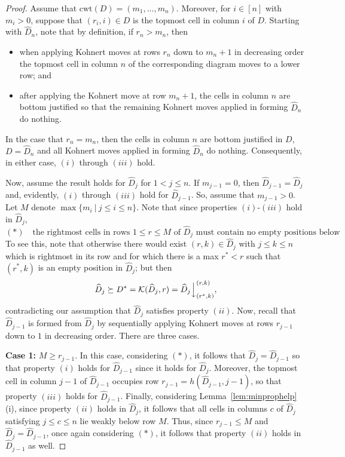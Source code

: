 \documentclass[letterpaper,10pt]{article}
\newcommand{\ldownarrow}{\Big\downarrow}
\begin{document}
\begin{proof}
    Assume that $\mathrm{cwt}(D)=(m_1,\hdots,m_n)$. Moreover, for $i\in [n]$ with $m_i>0$, suppose that $(r_i,i)\in D$ is the topmost cell in column $i$ of $D$. Starting with $\widehat{D}_{n}$, note that by definition, if $r_n>m_n$, then 
    \begin{itemize}
        \item when applying Kohnert moves at rows $r_n$ down to $m_n+1$ in decreasing order the topmost cell in column $n$ of the corresponding diagram moves to a lower row; and
        \item after applying the Kohnert move at row $m_n+1$, the cells in column $n$ are bottom justified so that the remaining Kohnert moves applied in forming $\widehat{D}_{n}$ do nothing.
    \end{itemize}
    In the case that $r_n=m_n$, then the cells in column $n$ are bottom justified in $D$, $D=\widehat{D}_{n}$ and all Kohnert moves applied in forming $\widehat{D}_{n}$ do nothing. Consequently, in either case, $(i)$ through $(iii)$ hold.

    Now, assume the result holds for $\widehat{D}_{j}$ for $1<j\le n$. If $m_{j-1}=0$, then $\widehat{D}_{j-1}=\widehat{D}_{j}$ and, evidently, $(i)$ through $(iii)$ hold for $\widehat{D}_{j-1}$. So, assume that $m_{j-1}>0$. Let $M$ denote $\max\{m_i~|~j\le i\le n\}$. Note that since properties $(i)$-$(iii)$ hold in $\widehat{D}_{j}$, $$(\ast)\quad \text{the rightmost cells in rows $1\le r\le M$ of $\widehat{D}_j$ must contain no empty positions below}.$$ To see this, note that otherwise there would exist $(r,k)\in \widehat{D}_{j}$ with $j\le k\le n$ which is rightmost in its row and for which there is a max $r^*<r$ such that $(r^*,k)$ is an empty position in $\widehat{D}_{j}$; but then $$\widehat{D}_{j}\succeq D^*=\mathcal{K}(\widehat{D}_{j},r)=\widehat{D}_{j}\ldownarrow^{(r,k)}_{(r^*,k)},$$ contradicting our assumption that $\widehat{D}_{j}$ satisfies property $(ii)$. Now, recall that $\widehat{D}_{j-1}$ is formed from $\widehat{D}_{j}$ by sequentially applying Kohnert moves at rows $r_{j-1}$ down to $1$ in decreasing order. There are three cases.
    \bigskip

    \noindent
    \textbf{Case 1:} $M\ge r_{j-1}$. In this case, considering $(\ast)$, it follows that $\widehat{D}_{j}=\widehat{D}_{j-1}$ so that property $(i)$ holds for $\widehat{D}_{j-1}$ since it holds for $\widehat{D}_{j}$. Moreover, the topmost cell in column $j-1$ of $\widehat{D}_{j-1}$ occupies row $r_{j-1}=h(\widehat{D}_{j-1},j-1)$, so that property $(iii)$ holds for $\widehat{D}_{j-1}$. Finally, considering Lemma~\ref{lem:minprophelp} (i), since property $(ii)$ holds in $\widehat{D}_j$, it follows that all cells in columns $c$ of $\widehat{D}_j$ satisfying $j\le c\le n$ lie weakly below row $M$. Thus, since $r_{j-1}\le M$ and $\widehat{D}_{j}=\widehat{D}_{j-1}$, once again considering $(\ast)$, it follows that property $(ii)$ holds in $\widehat{D}_{j-1}$ as well.
    \bigskip


\end{proof}
\end{document}
